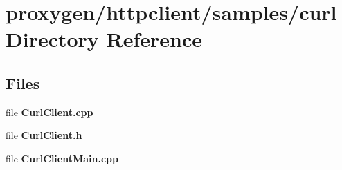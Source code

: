 \section{proxygen/httpclient/samples/curl Directory Reference}
\label{dir_7db7373c7892bcaed894d19f5ade1380}
\subsection*{Files}
\begin{DoxyCompactItemize}
\item 
file {\bf Curl\+Client.\+cpp}
\item 
file {\bf Curl\+Client.\+h}
\item 
file {\bf Curl\+Client\+Main.\+cpp}
\end{DoxyCompactItemize}
